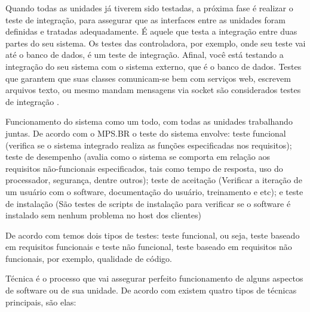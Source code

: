 Quando todas as unidades já tiverem sido testadas, a próxima fase é realizar o teste de integração, para assegurar que
as interfaces entre as unidades foram definidas e tratadas adequadamente. É aquele que testa a integração entre duas
partes do seu sistema. Os testes das controladora, por exemplo, onde seu teste vai até o banco de dados, é um teste de
integração. Afinal, você está testando a integração do seu sistema com o sistema externo, que é o banco de dados. Testes
que garantem que suas classes comunicam-se bem com serviços web, escrevem arquivos texto, ou mesmo mandam mensagens via
socket são considerados testes de integração \cite{myers}.

Funcionamento do sistema como um todo, com todas as unidades trabalhando juntas. De acordo com o MPS.BR o teste do
sistema envolve: teste funcional (verifica se o sistema integrado realiza as funções especificadas nos requisitos);
teste de desempenho (avalia como o sistema se comporta em relação aos requisitos não-funcionais especificados, tais como
tempo de resposta, uso do processador, segurança, dentre outros); teste de aceitação (Verificar a iteração de um usuário
com o software, documentação do usuário, treinamento e etc); e teste de instalação (São testes de scripts de instalação
para verificar se o software é instalado sem nenhum problema no host dos clientes) \cite{myers}

De acordo com \cite{myers} temos dois tipos de testes: teste funcional, ou seja, teste baseado em requisitos
funcionais e teste não funcional, teste baseado em requisitos não funcionais, por exemplo, qualidade de código.

Técnica é o processo que vai assegurar perfeito funcionamento de alguns aspectos de software ou de sua unidade. De
acordo com \cite{myers} existem quatro tipos de técnicas principais, são elas:

